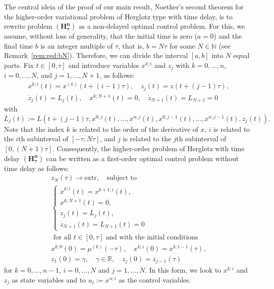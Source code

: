 \documentclass{my-aims}
\theoremstyle{definition}
\begin{document}
The central ideia of the proof of our main result, 
Noether's second theorem for the higher-order 
variational problem of Herglotz type with time delay, 
is to rewrite problem $\mathbf{(H_\tau^n)}$ as a 
non-delayed optimal control problem. For this, 
we assume, without loss of generality, 
that the initial time is zero ($a=0$)
and the final time $b$ is an integer multiple of $\tau$, that is,
$b=N\tau$ for some $N \in \mathbb{N}$ (see Remark~\ref{rem:red:bN}).
Therefore, we can divide the interval $[a,b]$ into $N$ equal parts.  
Fix $t \in [0,\tau]$ and introduce variables $x^{k;i}$ and $z_j$ 
with $k=0,\dots,n$, $i=0,\dots,N$, and $j=1,\dots, N+1$, as follows:
\begin{equation}
\label{reduction}
\begin{gathered}
x^{k;i}(t)=x^{(k)}(t+(i-1)\tau),
\quad z_j(t)=z(t+(j-1)\tau),\\
\dot{z}_j(t)=L_j(t),\quad
x^{k;N+1}(t)=0,
\quad \dot{z}_{N+1}(t)=L_{N+1}=0
\end{gathered}
\end{equation}
with
$$
L_j(t):=L\left(t+(j-1)\tau,x^{0;j}(t),\dots,x^{n;j}(t),
x^{0;j-1}(t),\dots,x^{n;j-1}(t),z_j(t)\right).
$$
Note that the index $k$ is related to the order
of the derivative of $x$, $i$ is related to the $i$th subinterval 
of $[-\tau,N\tau]$, and $j$ is related to the $j$th subinterval
of $[0,(N+1)\tau]$. Consequently, the higher-order problem 
of Herglotz with time delay $\mathbf{(H_\tau^n)}$ can be written 
as a first-order optimal control problem without time delay as follows:
\begin{equation}
\label{Problem:OC:non:delayed:form}
\begin{gathered}
z_N(\tau)\longrightarrow \mathrm{extr},\quad \text{subject to }\\
\begin{cases}
\dot{x}^{k;i}(t)=x^{k+1;i}(t),  \\
x^{k;N+1}(t)=0,\\
\dot{z}_j(t)=L_j(t), \\
\dot{z}_{N+1}(t)=L_{N+1}(t)=0
\end{cases}\\
\text{ for all } t \in[0,\tau] \text{ and with the initial conditions}\\
x^{k;0}(0)=\mu^{(k)}(-\tau),\quad
x^{k;i}(0)=x^{k;i-1}(\tau),\\
z_1(0)=\gamma,\quad \gamma \in \mathbb{R},
\quad z_j(0)=z_{j-1}(\tau)
\end{gathered}	
\end{equation}
for $k=0, \dots, n-1$, $i=0,\dots, N$ and $j=1,\dots, N$.
In this form, we look to $x^{k;i}$ and $z_j$ as state variables
and to $u_i:=x^{n;i}$ as the control variables.
\end{document}
